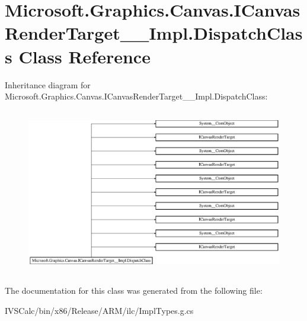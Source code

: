 \hypertarget{class_microsoft_1_1_graphics_1_1_canvas_1_1_i_canvas_render_target_____impl_1_1_dispatch_class}{}\section{Microsoft.\+Graphics.\+Canvas.\+I\+Canvas\+Render\+Target\+\_\+\+\_\+\+Impl.\+Dispatch\+Class Class Reference}
\label{class_microsoft_1_1_graphics_1_1_canvas_1_1_i_canvas_render_target_____impl_1_1_dispatch_class}
Inheritance diagram for Microsoft.\+Graphics.\+Canvas.\+I\+Canvas\+Render\+Target\+\_\+\+\_\+\+Impl.\+Dispatch\+Class\+:\begin{figure}[H]
\begin{center}
\leavevmode
\includegraphics[height=7.298578cm]{class_microsoft_1_1_graphics_1_1_canvas_1_1_i_canvas_render_target_____impl_1_1_dispatch_class}
\end{center}
\end{figure}


The documentation for this class was generated from the following file\+:\begin{DoxyCompactItemize}
\item 
I\+V\+S\+Calc/bin/x86/\+Release/\+A\+R\+M/ilc/Impl\+Types.\+g.\+cs\end{DoxyCompactItemize}
